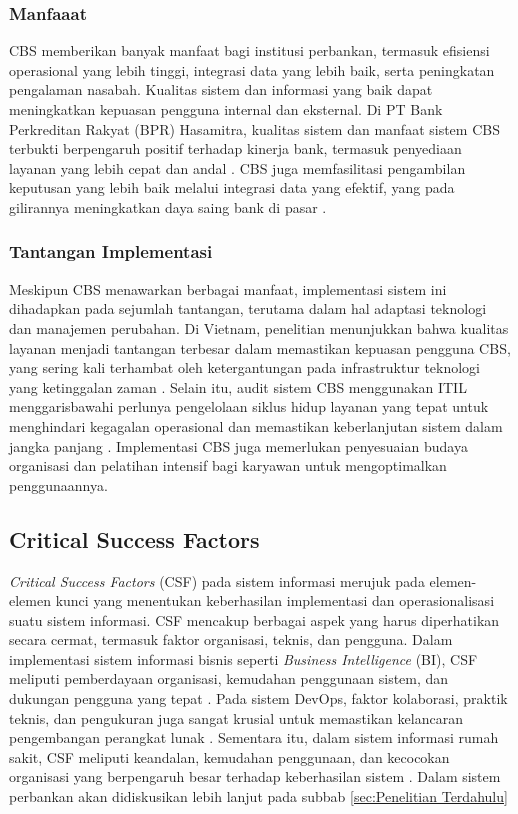 \documentclass[journal,article,submit,pdftex,moreauthors]{Definitions/mdpi}
\begin{document}
\subsubsection{Manfaaat}

CBS memberikan banyak manfaat bagi institusi perbankan, termasuk efisiensi operasional yang lebih tinggi, integrasi data yang lebih baik, serta peningkatan pengalaman nasabah. Kualitas sistem dan informasi yang baik dapat meningkatkan kepuasan pengguna internal dan eksternal. Di PT Bank Perkreditan Rakyat (BPR) Hasamitra, kualitas sistem dan manfaat sistem CBS terbukti berpengaruh positif terhadap kinerja bank, termasuk penyediaan layanan yang lebih cepat dan andal \cite{basyir-cbs}. CBS juga memfasilitasi pengambilan keputusan yang lebih baik melalui integrasi data yang efektif, yang pada gilirannya meningkatkan daya saing bank di pasar \cite{pratama-cbs}.

\subsubsection{Tantangan Implementasi}

Meskipun CBS menawarkan berbagai manfaat, implementasi sistem ini dihadapkan pada sejumlah tantangan, terutama dalam hal adaptasi teknologi dan manajemen perubahan. Di Vietnam, penelitian menunjukkan bahwa kualitas layanan menjadi tantangan terbesar dalam memastikan kepuasan pengguna CBS, yang sering kali terhambat oleh ketergantungan pada infrastruktur teknologi yang ketinggalan zaman \cite{Hsiao-ebanking}. Selain itu, audit sistem CBS menggunakan ITIL menggarisbawahi perlunya pengelolaan siklus hidup layanan yang tepat untuk menghindari kegagalan operasional dan memastikan keberlanjutan sistem dalam jangka panjang \cite{wahyudi-cbs}. Implementasi CBS juga memerlukan penyesuaian budaya organisasi dan pelatihan intensif bagi karyawan untuk mengoptimalkan penggunaannya.

\subsection{Critical Success Factors}
    \textit{Critical Success Factors} (CSF) pada sistem informasi merujuk pada elemen-elemen kunci yang menentukan keberhasilan implementasi dan operasionalisasi suatu sistem informasi. CSF mencakup berbagai aspek yang harus diperhatikan secara cermat, termasuk faktor organisasi, teknis, dan pengguna. Dalam implementasi sistem informasi bisnis seperti \textit{Business Intelligence} (BI), CSF meliputi pemberdayaan organisasi, kemudahan penggunaan sistem, dan dukungan pengguna yang tepat \cite{harfoush2024critical}. Pada sistem DevOps, faktor kolaborasi, praktik teknis, dan pengukuran juga sangat krusial untuk memastikan kelancaran pengembangan perangkat lunak \cite{jayakody2023devops}. Sementara itu, dalam sistem informasi rumah sakit, CSF meliputi keandalan, kemudahan penggunaan, dan kecocokan organisasi yang berpengaruh besar terhadap keberhasilan sistem \cite{arpaci2023hospital}. Dalam sistem perbankan akan didiskusikan lebih lanjut pada subbab \ref{sec:Penelitian Terdahulu} 
\end{document}

